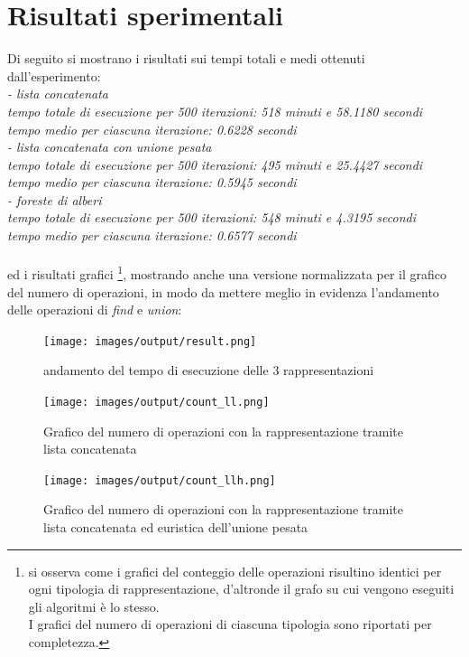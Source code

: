 \documentclass[12pt]{article}
\begin{document}
\section{Risultati sperimentali}
Di seguito si mostrano i risultati sui tempi totali e medi ottenuti dall'esperimento:\\
\textit{- lista concatenata\\
tempo totale di esecuzione per  500  iterazioni:  518  minuti e  58.1180  secondi\\
tempo medio per ciascuna iterazione:  0.6228 secondi\\
- lista concatenata con unione pesata\\
tempo totale di esecuzione per  500  iterazioni:  495  minuti e  25.4427  secondi\\
tempo medio per ciascuna iterazione:  0.5945 secondi\\
- foreste di alberi\\
tempo totale di esecuzione per  500  iterazioni:  548  minuti e  4.3195  secondi \\
tempo medio per ciascuna iterazione:  0.6577 secondi\\
}\\
ed i risultati grafici \footnote{si osserva come i grafici del conteggio delle operazioni risultino identici per ogni tipologia di rappresentazione, d'altronde il grafo su cui vengono eseguiti gli algoritmi è lo stesso.\\
I grafici del numero di operazioni di ciascuna tipologia sono riportati per completezza.}, mostrando anche una versione normalizzata per il grafico del numero di operazioni, in modo da mettere meglio in evidenza l'andamento delle operazioni di \textit{find} e \textit{union}:

    \begin{figure}[h]
        \centering
        \texttt{[image: images/output/result.png]}
        \caption{andamento del tempo di esecuzione delle 3 rappresentazioni}
        \label{fig:result}
    \end{figure}

    \begin{figure}[h]
        \texttt{[image: images/output/count\_ll.png]}
        \caption{Grafico del numero di operazioni con la rappresentazione tramite lista concatenata}
        \label{fig:count_ll}
    \end{figure}

    \begin{figure}[h]
        \texttt{[image: images/output/count\_llh.png]}
        \caption{Grafico del numero di operazioni con la rappresentazione tramite lista concatenata ed euristica dell'unione pesata}
        \label{fig:count_llh}
    \end{figure}
\end{document}
